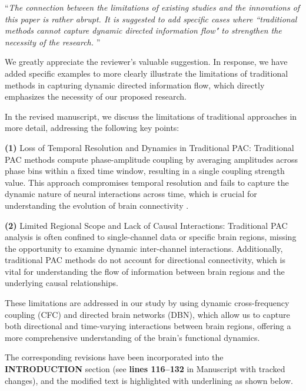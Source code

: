 \documentclass[12pt,technote,onecolumn]{IEEEtran}
\begin{document}
\vspace{4mm} 

 ``{\it The connection between the limitations of existing studies and the innovations of this paper is rather abrupt. It is suggested to add specific cases where ``traditional methods cannot capture dynamic directed information flow" to strengthen the necessity of the research.
}''
\vspace{1mm}


We greatly appreciate the reviewer’s valuable suggestion. In response, we have added specific examples to more clearly illustrate the limitations of traditional methods in capturing dynamic directed information flow, which directly emphasizes the necessity of our proposed research.

In the revised manuscript, we discuss the limitations of traditional approaches in more detail, addressing the following key points:

\textbf{(1)} Loss of Temporal Resolution and Dynamics in Traditional PAC: Traditional PAC methods compute phase-amplitude coupling by averaging amplitudes across phase bins within a fixed time window, resulting in a single coupling strength value. This approach compromises temporal resolution and fails to capture the dynamic nature of neural interactions across time, which is crucial for understanding the evolution of brain connectivity \cite{tort2010measuring,voytek2013method}.

\textbf{(2)} Limited Regional Scope and Lack of Causal Interactions: Traditional PAC analysis is often confined to single-channel data or specific brain regions, missing the opportunity to examine dynamic inter-channel interactions. Additionally, traditional PAC methods do not account for directional connectivity, which is vital for understanding the flow of information between brain regions and the underlying causal relationships. 

These limitations are addressed in our study by using dynamic cross-frequency coupling (CFC) and directed brain networks (DBN), which allow us to capture both directional and time-varying interactions between brain regions, offering a more comprehensive understanding of the brain’s functional dynamics.

The corresponding revisions have been incorporated into the \textbf{INTRODUCTION} section (see \textbf{lines 116–132} in Manuscript with tracked changes), and the modified text is highlighted with underlining as shown below.
\end{document}
